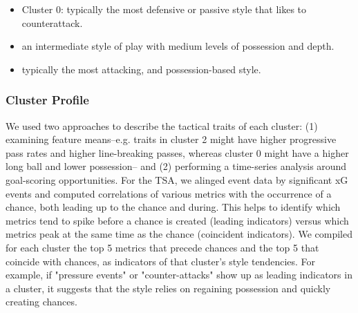 \documentclass[11pt]{article}
\begin{document}
\begin{itemize}
    \item Cluster 0: typically the most defensive or passive style that likes to counterattack.
    \item an intermediate style of play with medium levels of possession and depth. 
    \item typically the most attacking, and possession-based style. 
\end{itemize}

\subsubsection*{Cluster Profile}
We used two approaches to describe the tactical traits of each cluster: (1) examining feature means--e.g. traits in cluster 2 might have higher progressive pass rates and higher line-breaking passes, whereas cluster 0 might have a higher long ball and lower possession-- and (2) performing a time-series analysis around goal-scoring opportunities. For the TSA, we alinged event data by significant xG events and computed correlations of various metrics with the occurrence of a chance, both leading up to the chance and during. This helps to identify which metrics tend to spike before a chance is created (leading indicators) versus which metrics peak at the same time as the chance (coincident indicators). We compiled for each cluster the top 5 metrics that precede chances and the top 5 that coincide with chances, as indicators of that cluster's style tendencies. For example, if "pressure events" or "counter-attacks" show up as leading indicators in a cluster, it suggests that the style relies on regaining possession and quickly creating chances. 
\end{document}
